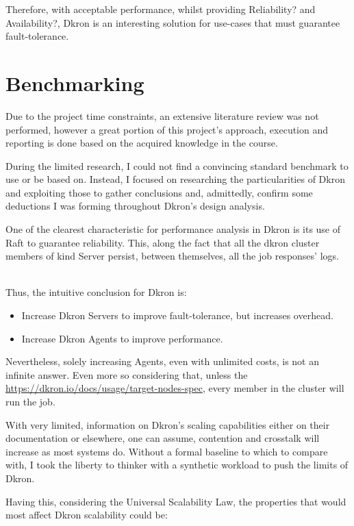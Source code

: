 \documentclass[runningheads]{llncs}
\begin{document}
Therefore, with acceptable performance, whilst providing Reliability? and Availability?, Dkron is an interesting solution
for use-cases that must guarantee fault-tolerance.

\section{Benchmarking}

Due to the project time constraints, an extensive literature review was not performed, however
a great portion of this project's approach, execution and reporting is done based on the acquired
knowledge in the course.

During the limited research, I could not find a convincing standard benchmark to use or be based on.
Instead, I focused on researching the particularities of Dkron and exploiting those to gather conclusions and,
admittedly, confirm some deductions I was forming throughout Dkron's design analysis.

One of the clearest characteristic for performance analysis in Dkron is its use of Raft to guarantee
reliability. This, along the fact that all the dkron cluster members of kind Server persist,
between themselves, all the job responses' logs.

~\\ Thus, the intuitive conclusion for Dkron is:
\begin{itemize}
    \item Increase Dkron Servers to improve fault-tolerance, but increases overhead.
    \item Increase Dkron Agents to improve performance.
\end{itemize}


Nevertheless, solely increasing Agents, even with unlimited costs, is not an infinite answer.
Even more so considering that, unless the
\href{job is targeted to a set of tags}{https://dkron.io/docs/usage/target-nodes-spec},
every member in the cluster will run the job.

With very limited, information on Dkron's scaling capabilities either on their
documentation or elsewhere, one can assume, contention and crosstalk will increase as most systems do.
Without a formal baseline to which to compare with, I took the liberty to thinker with a synthetic workload
to push the limits of Dkron.

Having this, considering the Universal Scalability Law, the properties that would most
affect Dkron scalability could be:
\end{document}
